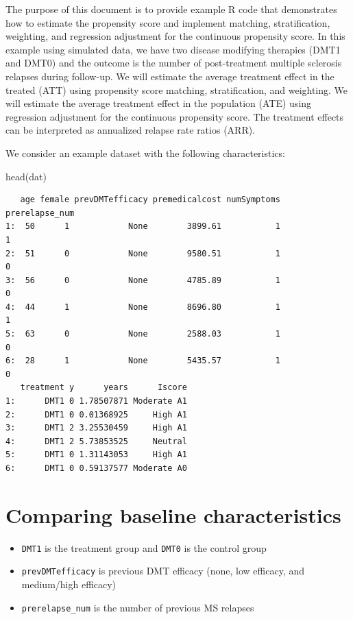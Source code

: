 \documentclass[
  letterpaper,
  DIV=11,
  numbers=noendperiod]{scrreprt}
\newenvironment{Shaded}{\begin{snugshade}}{\end{snugshade}}
\newcommand{\FunctionTok}[1]{\textcolor[rgb]{0.28,0.35,0.67}{#1}}
\newcommand{\NormalTok}[1]{\textcolor[rgb]{0.00,0.23,0.31}{#1}}
\providecommand{\tightlist}{%
  \setlength{\itemsep}{0pt}\setlength{\parskip}{0pt}}\usepackage{longtable,booktabs,array}
\begin{document}
The purpose of this document is to provide example R code that
demonstrates how to estimate the propensity score and implement
matching, stratification, weighting, and regression adjustment for the
continuous propensity score. In this example using simulated data, we
have two disease modifying therapies (DMT1 and DMT0) and the outcome is
the number of post-treatment multiple sclerosis relapses during
follow-up. We will estimate the average treatment effect in the treated
(ATT) using propensity score matching, stratification, and weighting. We
will estimate the average treatment effect in the population (ATE) using
regression adjustment for the continuous propensity score. The treatment
effects can be interpreted as annualized relapse rate ratios (ARR).

We consider an example dataset with the following characteristics:

\begin{Shaded}
\begin{Highlighting}[]
\FunctionTok{head}\NormalTok{(dat)}
\end{Highlighting}
\end{Shaded}

\begin{verbatim}
   age female prevDMTefficacy premedicalcost numSymptoms prerelapse_num
1:  50      1            None        3899.61           1              1
2:  51      0            None        9580.51           1              0
3:  56      0            None        4785.89           1              0
4:  44      1            None        8696.80           1              1
5:  63      0            None        2588.03           1              0
6:  28      1            None        5435.57           1              0
   treatment y      years      Iscore
1:      DMT1 0 1.78507871 Moderate A1
2:      DMT1 0 0.01368925     High A1
3:      DMT1 2 3.25530459     High A1
4:      DMT1 2 5.73853525     Neutral
5:      DMT1 0 1.31143053     High A1
6:      DMT1 0 0.59137577 Moderate A0
\end{verbatim}

\hypertarget{comparing-baseline-characteristics}{%
\section{Comparing baseline
characteristics}\label{comparing-baseline-characteristics}}

\begin{itemize}
\tightlist
\item
  \texttt{DMT1} is the treatment group and \texttt{DMT0} is the control
  group
\item
  \texttt{prevDMTefficacy} is previous DMT efficacy (none, low efficacy,
  and medium/high efficacy)
\item
  \texttt{prerelapse\_num} is the number of previous MS relapses
\end{itemize}
\end{document}
